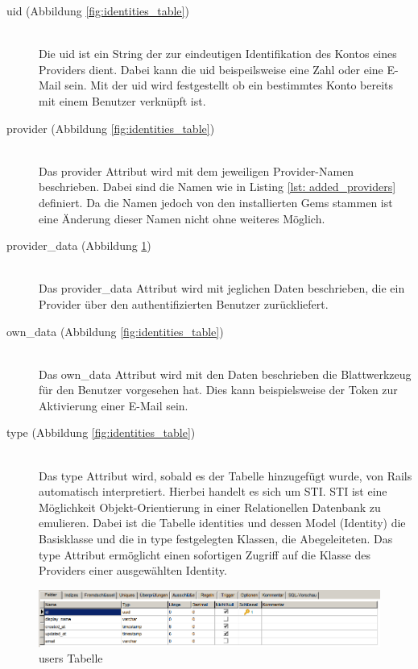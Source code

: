 \documentclass[paper=a4,fontsize=12pt,parskip=half]{scrartcl}
\begin{document}
	\begin{description}
		\item[uid (Abbildung \ref{fig:identities_table})]\hfill\\
		Die uid ist ein String der zur eindeutigen Identifikation des Kontos eines Providers dient. Dabei kann die uid beispeilsweise eine Zahl oder eine E-Mail sein. Mit der uid wird festgestellt ob ein bestimmtes Konto bereits mit einem Benutzer verknüpft ist.
		\item[provider (Abbildung \ref{fig:identities_table})]\hfill\\
		Das provider Attribut wird mit dem jeweiligen Provider-Namen beschrieben. Dabei sind die Namen wie in Listing \ref{lst: added_providers} definiert. Da die Namen jedoch von den installierten Gems stammen ist eine Änderung dieser Namen nicht ohne weiteres Möglich.
		\item[provider\_data (Abbildung \ref{fig:users_table})]\hfill\\
		Das provider\_data Attribut wird mit jeglichen Daten beschrieben, die ein Provider über den authentifizierten Benutzer zurückliefert. 
		\item[own\_data (Abbildung \ref{fig:identities_table})]\hfill\\
		Das own\_data Attribut wird mit den Daten beschrieben die Blattwerkzeug für den Benutzer vorgesehen hat. Dies kann beispielsweise der Token zur Aktivierung einer E-Mail sein.
		\item[type (Abbildung \ref{fig:identities_table})]\hfill\\
		Das type Attribut wird, sobald es der Tabelle hinzugefügt wurde, von Rails automatisch interpretiert. Hierbei handelt es sich um \gls{STI}. \gls{STI} ist eine Möglichkeit Objekt-Orientierung in einer Relationellen Datenbank zu emulieren. Dabei ist die Tabelle identities und dessen Model (Identity) die Basisklasse und die in type festgelegten Klassen, die Abegeleiteten. Das type Attribut ermöglicht einen sofortigen Zugriff auf die Klasse des Providers einer ausgewählten Identity.
	\end{description}
	
	\begin{figure}[h]
		\includegraphics[width=\textwidth]{images/users_table.png}
		\caption{users Tabelle}
		\label{fig:users_table}
	\end{figure}
\end{document}
